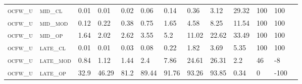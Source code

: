 \begin{sidewaystable}[!htbp]
\begin{tabular}{@{}lllllllllllll@{}}
\footnotesize \textsc{ocfw\_u}     & \footnotesize \textsc{mid\_cl   }                & \footnotesize 0.01            & \footnotesize 0.01            & \footnotesize 0.02             & \footnotesize 0.06             & \footnotesize 0.14             & \footnotesize 0.36             & \footnotesize 3.12       & \footnotesize 29.32    & \footnotesize 100    & \footnotesize 100      \\
\footnotesize \textsc{ocfw\_u}     & \footnotesize \textsc{mid\_mod  }                & \footnotesize 0.12            & \footnotesize 0.22            & \footnotesize 0.38             & \footnotesize 0.75             & \footnotesize 1.65             & \footnotesize 4.58             & \footnotesize 8.25       & \footnotesize 11.54    & \footnotesize 100    & \footnotesize 100      \\
\footnotesize \textsc{ocfw\_u}     & \footnotesize \textsc{mid\_op   }                & \footnotesize 1.64            & \footnotesize 2.02            & \footnotesize 2.62             & \footnotesize 3.55             & \footnotesize 5.2              & \footnotesize 11.02            & \footnotesize 22.62      & \footnotesize 33.49    & \footnotesize 100    & \footnotesize 100      \\
\footnotesize \textsc{ocfw\_u}     & \footnotesize \textsc{late\_cl  }                & \footnotesize 0.01            & \footnotesize 0.01            & \footnotesize 0.03             & \footnotesize 0.08             & \footnotesize 0.22             & \footnotesize 1.82             & \footnotesize 3.69       & \footnotesize 5.35     & \footnotesize 100    & \footnotesize 100      \\
\footnotesize \textsc{ocfw\_u}     & \footnotesize \textsc{late\_mod }                & \footnotesize 0.84            & \footnotesize 1.12            & \footnotesize 1.44             & \footnotesize 2.4              & \footnotesize 7.86             & \footnotesize 24.61            & \footnotesize 26.31      & \footnotesize 2.2      & \footnotesize 46     & \footnotesize -8       \\
\footnotesize \textsc{ocfw\_u}     & \footnotesize \textsc{late\_op  }                & \footnotesize 32.9            & \footnotesize 46.29           & \footnotesize 81.2             & \footnotesize 89.44            & \footnotesize 91.76            & \footnotesize 93.26            & \footnotesize 93.85      & \footnotesize 0.34     & \footnotesize 0      & \footnotesize -100     \\
\end{tabular}
\end{sidewaystable}


